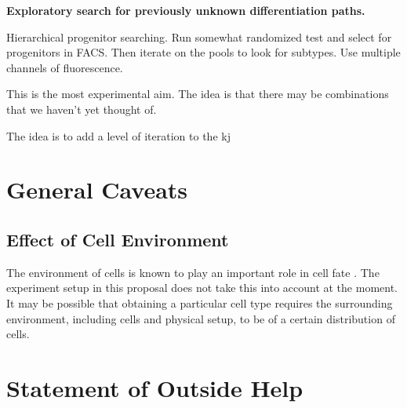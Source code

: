 \documentclass[10pt]{article}
\begin{document}
\textbf{Exploratory search for previously unknown differentiation paths.}

Hierarchical progenitor searching. Run somewhat randomized test and select for progenitors in FACS. Then iterate on the pools to look for subtypes. Use multiple channels of fluorescence.

This is the most experimental aim. The idea is that there may be combinations that we haven't yet thought of.

The idea is to add a level of iteration to the kj

\section*{General Caveats}

\subsection*{Effect of Cell Environment}

The environment of cells is known to play an important role in cell fate \cite{drummond2008stem}. The experiment setup in this proposal does not take this into account at the moment. It may be possible that obtaining a particular cell type requires the surrounding environment, including cells and physical setup, to be of a certain distribution of cells.




\pagebreak




\section*{Statement of Outside Help}
\end{document}
